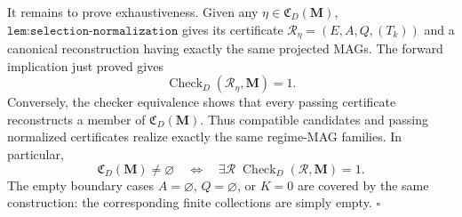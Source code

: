 It remains to prove exhaustiveness.  Given any \(\eta\in\mathfrak C_D(\mathbf M)\), \(\texttt{lem:selection-normalization}\) gives its certificate \(\mathcal R_\eta=(E,A,Q,(T_k))\) and a canonical reconstruction having exactly the same projected MAGs.  The forward implication just proved gives
\[
\operatorname{Check}_{D}(\mathcal R_\eta,\mathbf M)=1.
\]
Conversely, the checker equivalence shows that every passing certificate reconstructs a member of \(\mathfrak C_D(\mathbf M)\).  Thus compatible candidates and passing normalized certificates realize exactly the same regime-MAG families.  In particular,
\[
\mathfrak C_D(\mathbf M)\ne\varnothing
\quad\Longleftrightarrow\quad
\exists\mathcal R\;\operatorname{Check}_{D}(\mathcal R,\mathbf M)=1.
\]
The empty boundary cases \(A=\varnothing\), \(Q=\varnothing\), or \(K=0\) are covered by the same construction: the corresponding finite collections are simply empty. \(\square\)